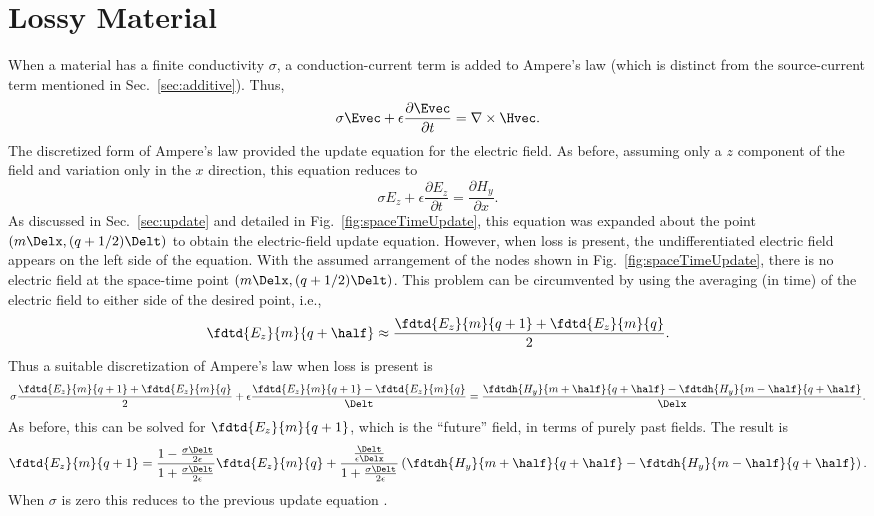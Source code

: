 \section{Lossy Material \label{sec:loss}}

When a material has a finite conductivity $\sigma$, a
conduction-current term is added to Ampere's law (which is distinct
from the source-current term mentioned in Sec.\ \ref{sec:additive}).
Thus,
\begin{equation}
  \sigma\Evec + \epsilon \frac{\partial \Evec}{\partial t} =
  \nabla \times \Hvec.
\end{equation}
The discretized form of Ampere's law provided the update equation for
the electric field.  As before, assuming only a $z$ component of the
field and variation only in the $x$ direction, this equation reduces to
\begin{equation}
  \sigma E_z + \epsilon \frac{\partial E_z}{\partial t} =
    \frac{\partial H_y}{\partial x}.
  \label{eq:ampereLoss}
\end{equation}
As discussed in Sec.\ \ref{sec:update} and detailed in Fig.\
\ref{fig:spaceTimeUpdate}, this equation was expanded about the point
$(m\Delx,(q+1/2)\Delt)$ to obtain the electric-field update equation.
However, when loss is present, the undifferentiated electric field
appears on the left side of the equation.  With the assumed
arrangement of the nodes shown in Fig.\ \ref{fig:spaceTimeUpdate},
there is no electric field at the space-time point
$(m\Delx,(q+1/2)\Delt)$.  This problem can be circumvented by using
the averaging (in time) of the electric field to either side of the
desired point, i.e.,
\begin{equation}
  \fdtd{E_z}{m}{q+\half} \approx 
  \frac{\fdtd{E_z}{m}{q+1}+\fdtd{E_z}{m}{q}}{2}.
\end{equation}
Thus a suitable discretization of Ampere's law when loss is present is
\begin{equation}
  \sigma \frac{\fdtd{E_z}{m}{q+1}+\fdtd{E_z}{m}{q}}{2} +
  \epsilon\frac{\fdtd{E_z}{m}{q+1} - \fdtd{E_z}{m}{q}}{\Delt} = 
  \frac{\fdtdh{H_y}{m+\half}{q+\half} - \fdtdh{H_y}{m-\half}{q+\half}}{\Delx}.
\end{equation}
As before, this can be solved for $\fdtd{E_z}{m}{q+1}$, which is the
``future'' field, in terms of purely past fields.  The result is
\begin{equation}
  \fdtd{E_z}{m}{q+1}=
  \frac{1-\frac{\sigma\Delt}{2\epsilon}}{1+\frac{\sigma\Delt}{2\epsilon}}
  \fdtd{E_z}{m}{q} +
  \frac{\frac{\Delt}{\epsilon\Delx}}{1+\frac{\sigma\Delt}{2\epsilon}}
  \left(\fdtdh{H_y}{m+\half}{q+\half} - \fdtdh{H_y}{m-\half}{q+\half}\right).
  \label{eq:updateEzLoss}
\end{equation}
When $\sigma$ is zero this reduces to the previous update equation
\refeq{eq:updateEz}.

